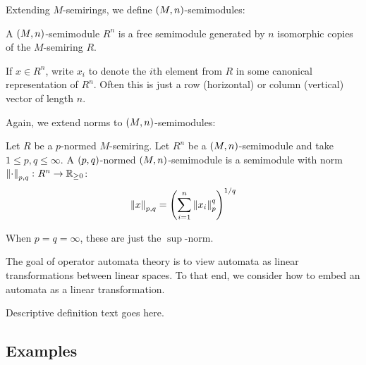 \documentclass[12pt]{article}
\begin{document}
Extending \(M\)-semirings,
we define \(\left(M, n\right)\)-semimodules:

\begin{definition}
  A \(\left(M, n\right)\)-semimodule \(R ^n\)
  is a free semimodule generated by \(n\) isomorphic copies of
  the \(M\)-semiring \(R\).
\end{definition}

If \(x \in R ^n\), write \(x_i\) to denote the \(i\)th element from
\(R\) in some canonical representation of \(R ^n\).
Often this is just a row (horizontal) or column (vertical)
vector of length \(n\).

Again, we extend norms to \(\left(M, n\right)\)-semimodules:

\begin{definition}
  Let \(R\) be a \(p\)-normed \(M\)-semiring.
  Let \(R ^n\) be a \(\left(M, n\right)\)-semimodule
  and take \(1 \leq p, q \leq \infty\).
  A \(\left(p, q\right)\)-normed \(\left(M, n\right)\)-semimodule
  is a semimodule with norm \(\left\lVert\cdot\right\rVert_{p, q} \colon R^n \to \mathbb{R}_{\geq 0}\):
  \begin{align*}
    \left\lVert x\right\rVert_{p, q}
      = \left(\sum_{i = 1}^{n} \left\lVert x_i\right\rVert_{p}^q\right)^{1 / q}
  \end{align*}
\end{definition}

When \(p = q = \infty\), these are just the \(\sup\)-norm.

The goal of operator automata theory is to view automata
as linear transformations between linear spaces.
To that end, we consider how to embed an automata as a linear transformation.

\begin{definition}
  Descriptive definition text goes here.
\end{definition}



\subsection{Examples}
\end{document}
